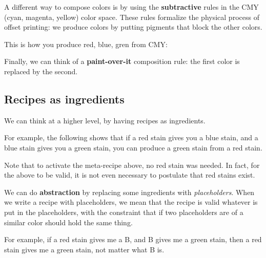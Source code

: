 \begin{center}
\end{center}


A different way to compose colors is by using the \textbf{subtractive} rules in the CMY (cyan, magenta, yellow) color space.
These rules formalize the physical process of offset printing: we produce colors by putting pigments that block the other colors.

\begin{center}
\end{center}

This is how you produce red, blue, gren from CMY:
\begin{center}
\end{center}

Finally, we can think of a \textbf{paint-over-it} composition rule: the first color is replaced by the second.


\subsection{Recipes as ingredients}

We can think at a higher level, by having recipes as ingredients.

For example, the following shows that if a red stain gives you a blue stain, and a blue stain gives you a green stain, you can produce a green stain from a red stain.



Note that to activate the meta-recipe above, no red stain was needed.
In fact, for the above to be valid, it is not even necessary to postulate that red stains exist.

We can do \textbf{abstraction} by replacing some ingredients with \emph{placeholders}.
When we write a recipe with placeholders, we mean that the recipe is valid whatever is put in the placeholders, with the constraint that if two placeholders are of a similar color should hold the same thing.

For example, if a red stain gives me a B, and B gives me a green stain, then a red stain gives me a green stain, not matter what B is.

